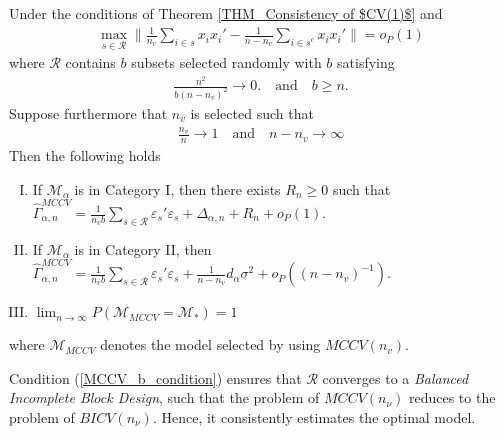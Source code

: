 \documentclass[Research_Module_ES.tex]{subfiles}
\begin{document}
\begin{thm}
\label{THM_Consistency_MCCV}
Under the conditions of Theorem \ref{THM_Consistency of $CV(1)$} and
\begin{align*}
\max_{s\in \mathcal{R}}\biggl\lVert \frac{1}{n_v}\sum_{i\in s}x_ix_i' - \frac{1}{n-n_v}\sum_{i\in s^c}x_ix_i'\biggr\rVert =o_P(1)
\end{align*}
where $\mathcal{R}$ contains $b$ subsets selected randomly with $b$ satisfying
\begin{align}
\frac{n^2}{b(n-n_v)^2}\to 0.\quad\textrm{and}\quad b\ge n.\label{MCCV_b_condition}
\end{align}
Suppose furthermore that $n_v$ is selected such that
\begin{align}
\frac{n_v}{n}\to 1 \quad \textrm{and} \quad n-n_v \to \infty\label{growth_rates_nv_MCCV}
\end{align}
Then the following holds
\begin{enumerate}[(I)]
\item If $\mathcal{M}_\alpha$ is in Category I, then there exists $R_n \ge 0$ such that $\hat{\Gamma}_{\alpha,n}^{MCCV} = \frac{1}{n_vb}\sum_{s\in \mathcal{R}}\varepsilon_s'\varepsilon_s + \Delta_{\alpha,n} + R_n + o_P(1)$.
\item If $\mathcal{M}_\alpha$ is in Category II, then $\hat{\Gamma}_{\alpha,n}^{MCCV} = \frac{1}{n_vb}\sum_{s\in \mathcal{R}}\varepsilon_s'\varepsilon_s + \frac{1}{n-n_v}d_\alpha\sigma^2  + o_P((n-n_v)^{-1})$.
\item $\lim_{n\to\infty}P(\mathcal{M}_{MCCV}=\mathcal{M}_\ast) = 1$
\end{enumerate}
where $\mathcal{M}_{MCCV}$ denotes the model selected by using $MCCV(n_v)$.
\end{thm}
Condition (\ref{MCCV_b_condition}) ensures that $\mathcal{R}$ converges to a \textit{Balanced Incomplete Block Design}, such that the problem of $MCCV(n_\nu)$ reduces to the problem of $BICV(n_\nu)$. Hence, it consistently estimates the optimal model. 
\end{document}
